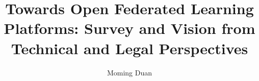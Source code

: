 \documentclass[acmlarge,screen,nonacm]{acmart}
\begin{document}
\title{Towards Open Federated Learning Platforms: Survey and Vision from Technical and Legal Perspectives}


\author{Moming Duan}

\begin{comment}
\author{Bingsheng He}
\affiliation{%
  \institution{National University of Singapore}
  \city{Singapore}
  \country{Singapore}}
\email{hebs@comp.nus.edu.sg}
\end{comment}

\renewcommand{\shortauthors}{Duan et al.}
\end{document}
